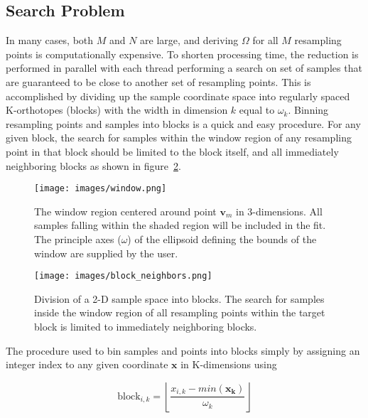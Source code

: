 \subsection{Search Problem}\label{subsec:search-problem}

In many cases, both $M$ and $N$ are large, and deriving $\Omega$ for all $M$
resampling points is computationally expensive.
To shorten processing time, the reduction is performed in parallel with each
thread performing a search on set of samples that are guaranteed to be close to
another set of resampling points.
This is accomplished by dividing up the sample coordinate space into regularly
spaced K-orthotopes (blocks) with the width in dimension $k$ equal to
$\omega_k$.
Binning resampling points and samples into blocks is a quick and easy procedure.
For any given block, the search for samples within the window region of any
resampling point in that block should be limited to the block itself, and all
immediately neighboring blocks as shown in figure~\ref{fig:block_neighbors}.

\begin{figure}[H]
  \begin{center}
  \texttt{[image: images/window.png]}
  \caption{The window region centered around point $\bm{v}_m$ in 3-dimensions.
           All samples falling within the shaded region will be included in
           the fit.  The principle axes ($\omega$) of the ellipsoid defining
           the bounds of the window are supplied by the user.}
  \label{fig:resampling_window}
  \end{center}
\end{figure}

\begin{figure}[H]
  \begin{center}
  \texttt{[image: images/block\_neighbors.png]}
  \caption{Division of a 2-D sample space into blocks.  The search for
           samples inside the window region of all resampling points within
           the target block is limited to immediately neighboring blocks.}
  \label{fig:block_neighbors}
  \end{center}
\end{figure}

The procedure used to bin samples and points into blocks simply by assigning an
integer index to any given coordinate $\bm{x}$ in K-dimensions using

\begin{equation}
    \text{block}_{i, k} = \left\lfloor
        \frac{x_{i,k} - min(\bm{x_k})}{\omega_k}
    \right\rfloor
    \label{eq:equation13}
\end{equation}

